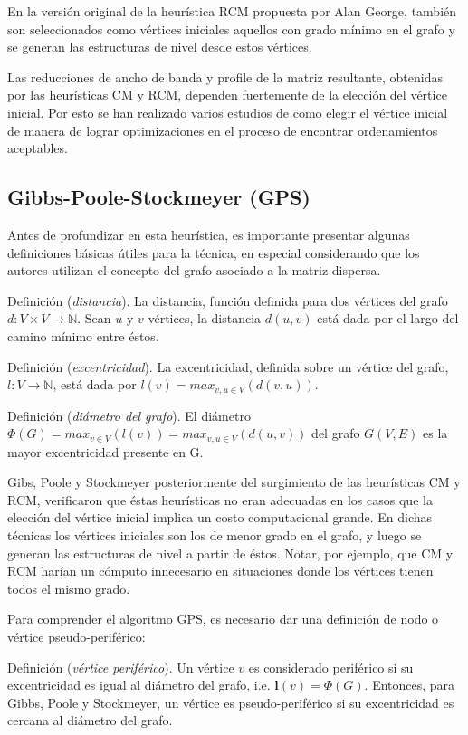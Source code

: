 En la versión original de la heurística RCM propuesta por Alan George, también son seleccionados como vértices iniciales aquellos con grado mínimo en el grafo y se generan las estructuras de nivel desde estos vértices.

Las reducciones de ancho de banda y profile de la matriz resultante, obtenidas por las heurísticas CM y RCM, dependen fuertemente de la elección del vértice inicial. Por esto se han realizado varios estudios de como elegir el vértice inicial de manera de lograr optimizaciones en el proceso de encontrar ordenamientos aceptables.


\subsection{Gibbs-Poole-Stockmeyer (GPS)}

Antes de profundizar en esta heurística, es importante presentar algunas definiciones básicas útiles para la técnica, en especial considerando que los autores utilizan el concepto del grafo asociado a la matriz dispersa.

Definición (\textit{distancia}). La distancia, función definida para dos vértices del grafo $\mathit{d} : V \times V \longrightarrow \mathbb{N}$. Sean $u$ y $v$ vértices, la distancia $\mathit{d}(u,v)$ está dada por el largo del camino mínimo entre éstos.

Definición (\textit{excentricidad}). La excentricidad, definida sobre un vértice del grafo, $\mathit{l} : V \longrightarrow \mathbb{N}$, está dada por $\mathit{l}(v) = max_{v,u \in V}(d(v,u))$.

Definición (\textit{diámetro del grafo}). El diámetro $\Phi(G) = max_{v \in V} (\mathit{l}(v)) = max_{v,u \in V} (d(u,v)) $ del grafo $G(V,E)$ es la mayor excentricidad presente en G.


Gibs, Poole y Stockmeyer posteriormente del surgimiento de las heurísticas CM y RCM, verificaron que éstas heurísticas no eran adecuadas en los casos que la elección del vértice inicial implica un costo computacional grande. En dichas técnicas los vértices iniciales son los de menor grado en el grafo, y luego se generan las estructuras de nivel a partir de éstos. Notar, por ejemplo, que CM y RCM harían un cómputo innecesario en situaciones donde los vértices tienen todos el mismo grado. 

Para comprender el algoritmo GPS, es necesario dar   una definición de nodo o vértice pseudo-periférico:

Definición (\textit{vértice periférico}). Un vértice $v$ es considerado periférico si su excentricidad es igual al diámetro del grafo, i.e.  $\mathbf{l}(v) = \Phi(G)$.
Entonces, para Gibbs, Poole y Stockmeyer, un vértice es pseudo-periférico si su excentricidad es cercana al diámetro del grafo. 

